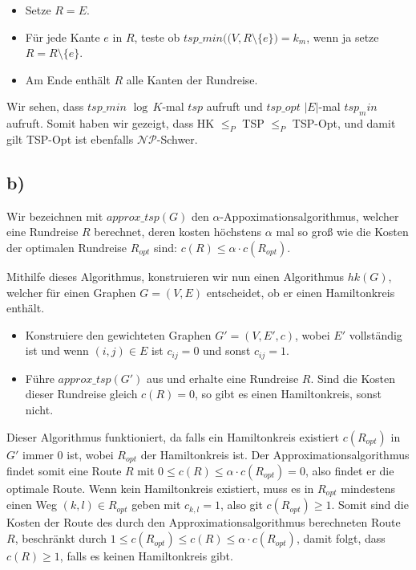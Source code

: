 \documentclass[a4paper,11pt]{article}
\begin{document}
\begin{itemize}
\item Setze $R=E$.
\item Für jede Kante $e$ in $R$, teste ob $tsp\_min\big((V,R\setminus\{e\}\big) = k_m$, wenn ja setze $R=R\setminus\{e\}$. 
\item Am Ende enthält $R$ alle Kanten der Rundreise. 
\end{itemize}

Wir sehen, dass $tsp\_min$ $\log\,K$-mal $tsp$ aufruft und $tsp\_opt$ $|E|$-mal $tsp_min$ aufruft. Somit haben wir gezeigt, dass HK $\leq_P$ TSP $\leq_P$ TSP-Opt, und damit gilt TSP-Opt ist ebenfalls $\mathcal{NP}$-Schwer. 

\subsection*{b)}
Wir bezeichnen mit $approx\_tsp(G)$ den $\alpha$-Appoximationsalgorithmus, welcher eine Rundreise $R$ berechnet, deren kosten höchstens $\alpha$ mal so groß wie die Kosten der optimalen Rundreise $R_{opt}$ sind: $c(R) \leq \alpha\cdot c(R_{opt})$.

Mithilfe dieses Algorithmus, konstruieren wir nun einen Algorithmus $hk(G)$, welcher für einen Graphen $G=(V,E)$ entscheidet, ob er einen Hamiltonkreis enthält. 

\begin{itemize}
\item Konstruiere den gewichteten Graphen $G'=(V,E',c)$, wobei $E'$ vollständig ist und wenn $(i,j)\in E$ ist $c_{ij}=0$ und sonst $c_{ij} = 1$. 
\item Führe $approx\_tsp(G')$ aus und erhalte eine Rundreise $R$. Sind die Kosten dieser Rundreise  gleich $c(R)=0$, so gibt es einen Hamiltonkreis, sonst nicht. 
\end{itemize}

Dieser Algorithmus funktioniert, da falls ein Hamiltonkreis existiert $c(R_{opt})$ in $G'$ immer 0 ist, wobei $R_{opt}$ der Hamiltonkreis ist. Der Approximationsalgorithmus findet somit eine Route $R$ mit $0 \leq c(R) \leq \alpha\cdot c(R_{opt}) = 0$, also findet er die optimale Route. Wenn kein Hamiltonkreis existiert, muss es in $R_{opt}$ mindestens einen Weg $(k,l)\in R_{opt}$ geben mit $c_{k,l} = 1$, also git $c(R_{opt})\geq 1$. Somit sind die Kosten der Route des durch den Approximationsalgorithmus berechneten Route $R$, beschränkt durch $1\leq c(R_{opt})\leq c(R)\leq\alpha\cdot c(R_{opt})$, damit folgt, dass $c(R) \geq 1$, falls es keinen Hamiltonkreis gibt. 
\end{document}
